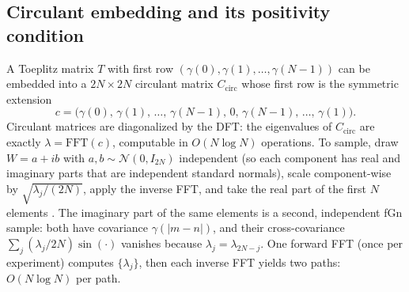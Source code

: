 \subsection{Circulant embedding and its positivity condition}
\label{sec:circulant}

A Toeplitz matrix $T$ with first row $(\gamma(0), \gamma(1), \ldots, \gamma(N-1))$
can be embedded into a $2N\times 2N$ circulant matrix $C_\mathrm{circ}$ whose
first row is the symmetric extension
\begin{equation}
  c = \bigl(\gamma(0),\, \gamma(1),\, \ldots,\, \gamma(N-1),\, 0,\,
             \gamma(N-1),\, \ldots,\, \gamma(1)\bigr).
\end{equation}
Circulant matrices are diagonalized by the DFT: the eigenvalues of $C_\mathrm{circ}$
are exactly $\lambda = \mathrm{FFT}(c)$, computable in $O(N\log N)$ operations.
To sample, draw $W = a + ib$ with $a, b \sim \mathcal{N}(0, I_{2N})$ independent
(so each component has real and imaginary parts that are independent standard
normals),
scale component-wise by $\sqrt{\lambda_j / (2N)}$, apply the inverse FFT, and take
the real part of the first $N$ elements \citep{davies1987tests}.  The imaginary part
of the same elements is a second, independent fGn sample: both have covariance
$\gamma(|m-n|)$, and their cross-covariance $\sum_j (\lambda_j/2N)\sin(\cdot)$ vanishes
because $\lambda_j = \lambda_{2N-j}$.  One forward FFT (once per experiment) computes
$\{\lambda_j\}$, then each inverse FFT yields two paths: $O(N\log N)$ per path.


